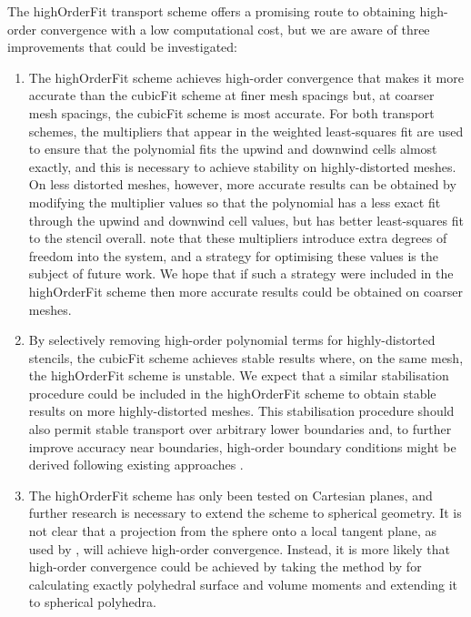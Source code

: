 The highOrderFit transport scheme offers a promising route to obtaining high-order convergence with a low computational cost, but we are aware of three improvements that could be investigated:
\begin{enumerate}
\item The highOrderFit scheme achieves high-order convergence that makes it more accurate than the cubicFit scheme at finer mesh spacings but, at coarser mesh spacings, the cubicFit scheme is most accurate.
For both transport schemes, the multipliers that appear in the weighted least-squares fit are used to ensure that the polynomial fits the upwind and downwind cells almost exactly, and this is necessary to achieve stability on highly-distorted meshes.
On less distorted meshes, however, more accurate results can be obtained by modifying the multiplier values so that the polynomial has a less exact fit through the upwind and downwind cell values, but has better least-squares fit to the stencil overall.
\citet{devendran2017} note that these multipliers introduce extra degrees of freedom into the system, and a strategy for optimising these values is the subject of future work.
We hope that if such a strategy were included in the highOrderFit scheme then more accurate results could be obtained on coarser meshes.
%
\item By selectively removing high-order polynomial terms for highly-distorted stencils, the cubicFit scheme achieves stable results where, on the same mesh, the highOrderFit scheme is unstable.
We expect that a similar stabilisation procedure could be included in the highOrderFit scheme to obtain stable results on more highly-distorted meshes.
This stabilisation procedure should also permit stable transport over arbitrary lower boundaries and, to further improve accuracy near boundaries, high-order boundary conditions might be derived following existing approaches \citep{devendran2017,schwartz2015}.
%
\item The highOrderFit scheme has only been tested on Cartesian planes, and further research is necessary to extend the scheme to spherical geometry.
It is not clear that a projection from the sphere onto a local tangent plane, as used by \citet{sjoegreen2012}, will achieve high-order convergence.
Instead, it is more likely that high-order convergence could be achieved by taking the method by \citet{tuzikov2003} for calculating exactly polyhedral surface and volume moments and extending it to spherical polyhedra.
\end{enumerate}

